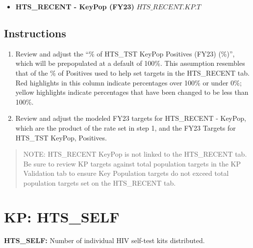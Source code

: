 \documentclass[
  openany]{book}
\providecommand{\tightlist}{%
  \setlength{\itemsep}{0pt}\setlength{\parskip}{0pt}}
\begin{document}
\begin{itemize}
\tightlist
\item
  \textbf{HTS\_RECENT - KeyPop (FY23)} \(HTS\_RECENT.KP.T\)
\end{itemize}

\hypertarget{instructions-40}{%
\subsection{Instructions}\label{instructions-40}}

\begin{enumerate}
\def\labelenumi{\arabic{enumi}.}
\item
  Review and adjust the ``\% of HTS\_TST KeyPop Positives (FY23) (\%)'',
  which will be prepopulated at a default of 100\%. This assumption
  resembles that of the \% of Positives used to help set targets in the
  HTS\_RECENT tab. Red highlights in this column indicate percentages
  over 100\% or under 0\%; yellow highlights indicate percentages that
  have been changed to be less than 100\%.
\item
  Review and adjust the modeled FY23 targets for HTS\_RECENT - KeyPop,
  which are the product of the rate set in step 1, and the FY23
  Targets for HTS\_TST KeyPop, Positives.
\end{enumerate}

\begin{quote}
NOTE: HTS\_RECENT KeyPop is not linked to the HTS\_RECENT tab. Be sure
to review KP targets against total population targets in the KP
Validation tab to ensure Key Population targets do not exceed total
population targets set on the HTS\_RECENT tab.
\end{quote}

\hypertarget{kp-hts_self}{%
\section{KP: HTS\_SELF}\label{kp-hts_self}}

\textbf{HTS\_SELF:} Number of individual HIV self-test kits distributed.
\end{document}
